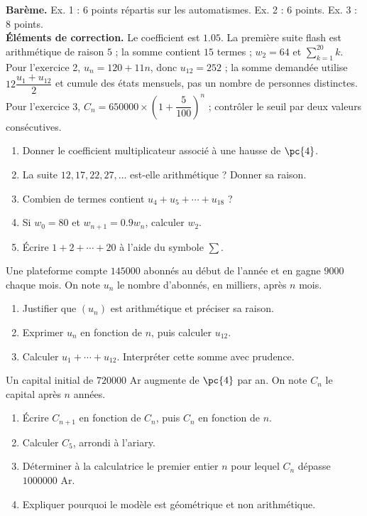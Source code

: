 \begin{solution}\textbf{Barème.} Ex. 1 : 6 points répartis sur les automatismes. Ex. 2 : 6 points. Ex. 3 : 8 points.\\
\textbf{Éléments de correction.} Le coefficient est $\num{1,05}$. La première suite flash est arithmétique de raison $5$ ; la somme contient $15$ termes ; $w_2=64$ et $\sum_{k=1}^{20}k$. Pour l'exercice 2, $u_n=120+11n$, donc $u_{12}=252$ ; la somme demandée utilise $12\dfrac{u_1+u_{12}}2$ et cumule des états mensuels, pas un nombre de personnes distinctes. Pour l'exercice 3, $C_n=\num{650000}\times\left(1+\dfrac{5}{100}\right)^n$ ; contrôler le seuil par deux valeurs consécutives.\end{solution}

\begin{exercise}[1 -- Automatismes]
\begin{enumerate}
\item Donner le coefficient multiplicateur associé à une hausse de $\pc{4}$.
\item La suite $12,17,22,27,\ldots$ est-elle arithmétique ? Donner sa raison.
\item Combien de termes contient $u_4+u_5+\cdots+u_{18}$ ?
\item Si $w_0=80$ et $w_{n+1}=\num{0,9}w_n$, calculer $w_2$.
\item Écrire $1+2+\cdots+20$ à l'aide du symbole $\sum$.
\end{enumerate}
\end{exercise}
\begin{exercise}[2 -- Abonnements]
Une plateforme compte $\num{145000}$ abonnés au début de l'année et en gagne $\num{9000}$ chaque mois. On note $u_n$ le nombre d'abonnés, en milliers, après $n$ mois.
\begin{enumerate}
\item Justifier que $(u_n)$ est arithmétique et préciser sa raison.
\item Exprimer $u_n$ en fonction de $n$, puis calculer $u_{12}$.
\item Calculer $u_1+\cdots+u_{12}$. Interpréter cette somme avec prudence.
\end{enumerate}
\end{exercise}
\begin{exercise}
Un capital initial de $\num{720000}$ Ar augmente de $\pc{4}$ par an. On note $C_n$ le capital après $n$ années.
\begin{enumerate}
\item Écrire $C_{n+1}$ en fonction de $C_n$, puis $C_n$ en fonction de $n$.
\item Calculer $C_5$, arrondi à l'ariary.
\item Déterminer à la calculatrice le premier entier $n$ pour lequel $C_n$ dépasse $\num{1000000}$ Ar.
\item Expliquer pourquoi le modèle est géométrique et non arithmétique.
\end{enumerate}
\end{exercise}
